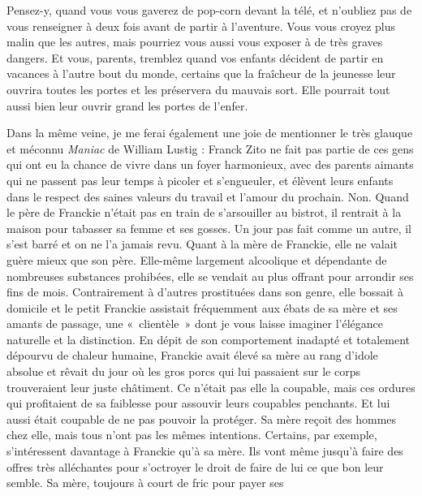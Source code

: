 Pensez-y, quand vous vous gaverez de pop-corn devant la télé, et n’oubliez pas de vous renseigner à deux fois avant de partir à l’aventure. Vous vous croyez plus malin que les autres, mais pourriez vous aussi vous exposer à de très graves dangers. Et vous, parents, tremblez quand vos enfants décident de partir en vacances à l’autre bout du monde, certains que la fraîcheur de la jeunesse leur ouvrira toutes les portes et les préservera du mauvais sort. Elle pourrait tout aussi bien leur ouvrir grand les portes de l’enfer.

%

Dans la même veine, je me ferai également une joie de mentionner le très glauque et méconnu \textit{Maniac} de William Lustig : Franck Zito ne fait pas partie de ces gens qui ont eu la chance de vivre dans un foyer harmonieux, avec des parents aimants qui ne passent pas leur temps à picoler et s’engueuler, et élèvent leurs enfants dans le respect des saines valeurs du travail et l’amour du prochain. Non. Quand le père de Franckie n’était pas en train de s’arsouiller au bistrot, il rentrait à la maison pour tabasser sa femme et ses gosses. Un jour pas fait comme un autre, il s’est barré et on ne l’a jamais revu. Quant à la mère de Franckie, elle ne valait guère mieux que son père. Elle-même largement alcoolique et dépendante de nombreuses substances prohibées, elle se vendait au plus offrant pour arrondir ses fins de mois. Contrairement à d’autres prostituées dans son genre, elle bossait à domicile et le petit Franckie assistait fréquemment aux ébats de sa mère et ses amants de passage, une «~clientèle~» dont je vous laisse imaginer l’élégance naturelle et la distinction. En dépit de son comportement inadapté et totalement dépourvu de chaleur humaine, Franckie avait élevé sa mère au rang d’idole absolue et rêvait du jour où les gros porcs qui lui passaient sur le corps trouveraient leur juste châtiment. Ce n’était pas elle la coupable, mais ces ordures qui profitaient de sa faiblesse pour assouvir leurs coupables penchants. Et lui aussi était coupable de ne pas pouvoir la protéger. Sa mère reçoit des hommes chez elle, mais tous n’ont pas les mêmes intentions. Certains, par exemple, s’intéressent davantage à Franckie qu’à sa mère. Ils vont même jusqu’à faire des offres très alléchantes pour s’octroyer le droit de faire de lui ce que bon leur semble. Sa mère, toujours à court de fric pour payer ses 